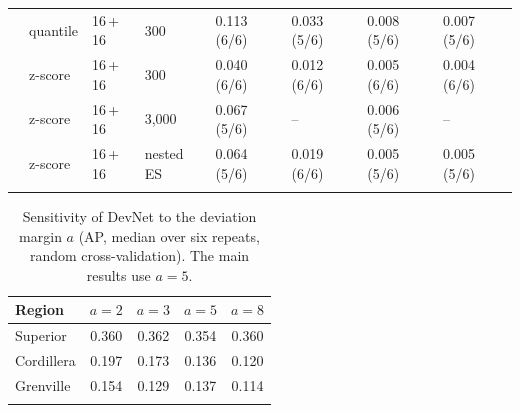 \documentclass[pdflatex,sn-apa]{sn-jnl}
\begin{document}
\begin{appendices}
\begin{table}[!h]
\begin{tabular*}{\textwidth}{@{\extracolsep\fill}llllllll}
 & quantile & 16\,+\,16 & 300 & 0.113 (6/6) & 0.033 (5/6) & 0.008 (5/6) & 0.007 (5/6) \\
 & z-score & 16\,+\,16 & 300 & 0.040 (6/6) & 0.012 (6/6) & 0.005 (6/6) & 0.004 (6/6) \\
 & z-score & 16\,+\,16 & 3,000 & 0.067 (5/6) & -- & 0.006 (5/6) & -- \\
 & z-score & 16\,+\,16 & nested ES & 0.064 (5/6) & 0.019 (6/6) & 0.005 (5/6) & 0.005 (5/6) \\
\botrule
\end{tabular*}
\end{table}

\begin{table}[!h]
\caption{Sensitivity of DevNet to the deviation margin $a$ (AP, median over six repeats, random cross-validation). The main results use $a = 5$.}\label{tab:margin}
\footnotesize
\begin{tabular*}{0.7\textwidth}{@{\extracolsep\fill}lcccc}
\toprule
Region & $a = 2$ & $a = 3$ & $a = 5$ & $a = 8$ \\
\midrule
Superior & 0.360 & 0.362 & 0.354 & 0.360 \\
Cordillera & 0.197 & 0.173 & 0.136 & 0.120 \\
Grenville & 0.154 & 0.129 & 0.137 & 0.114 \\
\botrule
\end{tabular*}
\end{table}

\end{appendices}

\clearpage


\end{document}
